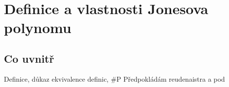 
\chapter{Definice a vlastnosti Jonesova polynomu}

\section{Co uvnitř}

Definice, důkaz ekvivalence definic, \#P 
Předpokládám reudenaistra a pod
